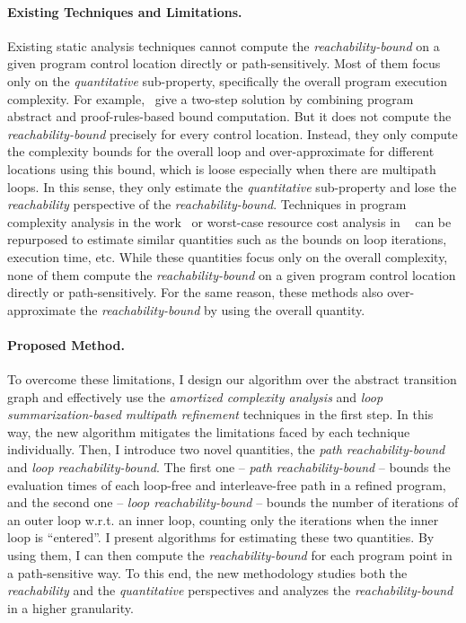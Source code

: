 \paragraph{Existing Techniques and Limitations.}
Existing static analysis techniques cannot compute the \emph{reachability-bound} on a given program control location directly or path-sensitively.
Most of them focus only on the \emph{quantitative} sub-property, specifically the overall program execution complexity.
For example,~\cite{GulwaniZ10}
give a two-step solution by combining program abstract and proof-rules-based bound computation.
But it does not compute the \emph{reachability-bound} precisely for every control location.
Instead, they only compute the complexity bounds for the overall loop and over-approximate for different locations using this bound,
which is loose especially when there are multipath loops.
In this sense, they only estimate the \emph{quantitative} sub-property and lose the \emph{reachability} perspective of the \emph{reachability-bound}.
Techniques in program complexity analysis in the work~\cite{GustafssonEL05,HumenbergerJK18} 
or worst-case resource cost analysis in
~\cite{BrockschmidtEFFG16,AlbertAGP08,AliasDFG10,Flores-MontoyaH14} can be repurposed to estimate similar quantities such as the
bounds on loop iterations, execution time, etc.
While these quantities focus only on 
the overall complexity,
none of them compute the \emph{reachability-bound} on a given program control location directly or path-sensitively.
For the same reason, these methods also over-approximate the \emph{reachability-bound}
by using the overall quantity.

\paragraph{Proposed Method.}
To overcome these limitations, 
I design
our algorithm
over the abstract transition graph and effectively use the \emph{amortized complexity analysis} and \emph{loop summarization-based multipath refinement} techniques in the first step.
In this way, the new algorithm mitigates the limitations faced by each technique individually. 
Then, I introduce two novel quantities,
the \emph{path reachability-bound} and \emph{loop reachability-bound}.
The first one -- \emph{path reachability-bound} -- bounds the evaluation times of each loop-free and interleave-free path in a refined program, and the second one -- \emph{loop reachability-bound} -- bounds the number of iterations of an outer loop w.r.t. an inner loop, counting only the iterations when the inner loop is ``entered''. 
I present algorithms for estimating these two quantities. By using them, I can then 
compute the \emph{reachability-bound} for each program point in a path-sensitive way.
To this end, the new methodology studies both the \emph{reachability} and the \emph{quantitative} perspectives and
analyzes the \emph{reachability-bound} in a higher granularity.